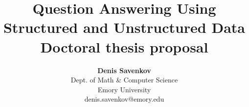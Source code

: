 \documentclass[12pt]{report}
\renewcommand{\baselinestretch}{1}
\begin{document}
\renewcommand{\baselinestretch}{1.3}

% 

\setlength{\headsep}{0.15in}
\setlength{\topmargin}{-.5in}
\pagestyle{empty}



\title{
\textbf{Question Answering Using Structured and Unstructured Data} \\
\normalfont Doctoral thesis proposal}
\author{\textbf{Denis Savenkov}\\
      Dept. of Math \& Computer Science\\
      Emory University\\
      denis.savenkov@emory.edu
}



\mydate

\maketitle
\end{document}
